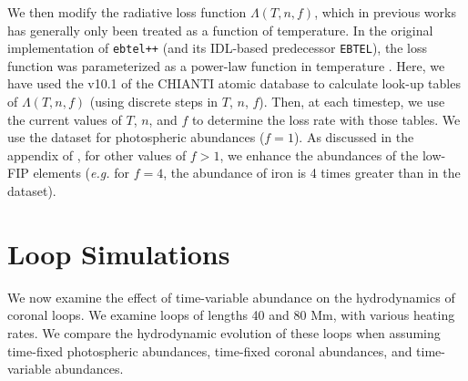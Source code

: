 \documentclass[twocolumn]{aastex631}
\begin{document}
We then modify the radiative loss function $\Lambda(T, n, f)$, which in previous works has generally only been treated as a function of temperature.  In the original implementation of \texttt{ebtel++} (and its IDL-based predecessor \texttt{EBTEL}), the loss function was parameterized as a power-law function in temperature \citep{klimchuk2008}.  Here, we have used the v10.1 of the CHIANTI atomic database \citep{dere1997,delzanna2021} to calculate look-up tables of $\Lambda(T, n, f)$ (using discrete steps in $T$, $n$, $f$).  Then, at each timestep, we use the current values of $T$, $n$, and $f$ to determine the loss rate with those tables.  We use the \citet{asplund2009} dataset for photospheric abundances ($f=1$).  As discussed in the appendix of \citet{reep2020}, for other values of $f > 1$, we enhance the abundances of the low-FIP elements (\textit{e.g.} for $f=4$, the abundance of iron is 4 times greater than in the \citealt{asplund2009} dataset).  

\section{Loop Simulations}
We now examine the effect of time-variable abundance on the hydrodynamics of coronal loops.  We examine loops of lengths 40 and 80 Mm, with various heating rates.  We compare the hydrodynamic evolution of these loops when assuming time-fixed photospheric abundances, time-fixed coronal abundances, and time-variable abundances. 
\end{document}
